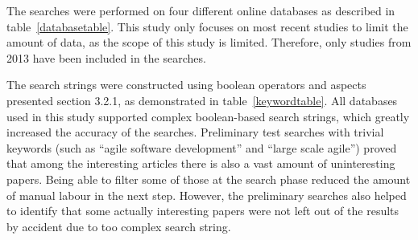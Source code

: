 The searches were performed on four different online databases as
described in table~\ref{databasetable}. This study only focuses on most recent studies to limit
the amount of data, as the scope of this study is limited. Therefore, only
studies from 2013 have been included in the searches.


\vspace{1cm}

The search strings were constructed using boolean operators and aspects
presented section 3.2.1, as demonstrated in table~\ref{keywordtable}\@. All databases
used in this study supported complex boolean-based search strings,
which greatly increased the accuracy of the searches. Preliminary test
searches with trivial keywords (such as ``agile software development'' and
``large scale agile'') proved that among the interesting articles there is
also a vast amount of uninteresting papers. Being able to filter some
of those at the search phase reduced the amount of manual labour in the
next step. However, the preliminary searches also helped to identify
that some actually interesting papers were not left out of the results
by accident due to too complex search string.

\medskip

\medskip
